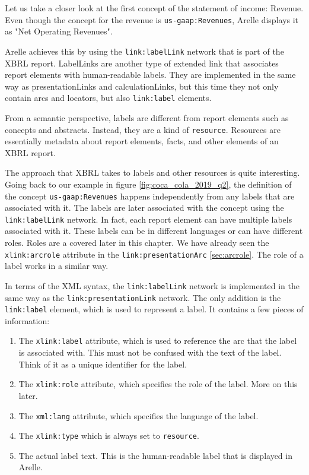 Let us take a closer look at the first concept of the statement of income: Revenue.
Even though the concept for the revenue is \texttt{us-gaap:Revenues}, Arelle displays it as "Net Operating Revenues".

Arelle achieves this by using the \texttt{link:labelLink} network that is part of the XBRL report. 
LabelLinks are another type of extended link that associates report elements with human-readable labels.
They are implemented in the same way as presentationLinks and calculationLinks, but this time they not only contain arcs and locators, but also \texttt{link:label} elements.

From a semantic perspective, labels are different from report elements such as concepts and abstracts.
Instead, they are a kind of \texttt{resource}.
Resources are essentially metadata about report elements, facts, and other elements of an XBRL report.

The approach that XBRL takes to labels and other resources is quite interesting.
Going back to our example in figure \ref{fig:coca_cola_2019_q2}, the definition of the concept \texttt{us-gaap:Revenues} happens independently from any labels that are associated with it.
The labels are later associated with the concept using the \texttt{link:labelLink} network.
In fact, each report element can have multiple labels associated with it.
These labels can be in different languages or can have different roles.
Roles are a covered later in this chapter.
We have already seen the \texttt{xlink:arcrole} attribute in the \texttt{link:presentationArc} \ref{sec:arcrole}.
The role of a label works in a similar way.

In terms of the XML syntax, the \texttt{link:labelLink} network is implemented in the same way as the \texttt{link:presentationLink} network.
The only addition is the \texttt{link:label} element, which is used to represent a label.
It contains a few pieces of information:

\begin{enumerate}
    \item The \texttt{xlink:label} attribute, which is used to reference the arc that the label is associated with.
    This must not be confused with the text of the label.
    Think of it as a unique identifier for the label.
    \item The \texttt{xlink:role} attribute, which specifies the role of the label. More on this later.
    \item The \texttt{xml:lang} attribute, which specifies the language of the label.
    \item The \texttt{xlink:type} which is always set to \texttt{resource}.
    \item The actual label text. This is the human-readable label that is displayed in Arelle.
\end{enumerate}

